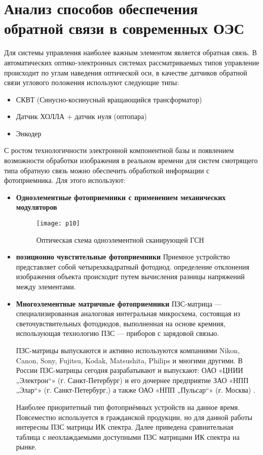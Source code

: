 \section{Анализ способов обеспечения обратной связи в современных ОЭС} \label{sec:ch1/sec3-}

Для системы управления наиболее важным элементом является обратная связь. В автоматических оптико-электронных системах рассматриваемых типов управление происходит по углам наведения оптической оси, в качестве датчиков обратной связи углового положения используют следующие типы:
\begin{itemize}
	\item СКВТ (Синусно-косинусный вращающийся трансформатор)
	\item Датчик ХОЛЛА + датчик нуля (оптопара)
	\item Энкодер
\end{itemize}
С ростом технологичности электронной компонентной базы и появлением возможности обработки изображения в реальном времени для систем смотрящего типа обратную связь можно обеспечить обработкой информации с фотоприемника. Для этого используют:

\begin{itemize}
	\item \textbf{Одноэлементные фотоприемники с применением механических модуляторов}
	\begin{figure}[ht]
		\centering
		\texttt{[image: p10]} 
		\caption{Оптическая схема одноэлементной сканирующей ГСН  }
		\label{fig:p10}
	\end{figure}
	\item \textbf{позиционно чувстительные фотоприемники}
	Приемное устройство представляет собой четырехквадратный фотодиод. определение отклонения изображения объекта происходит путем вычисления разницы напряжений между элементами. 
	
	
	\item \textbf{Многоэлементные матричные фотоприемники}
	ПЗС-матрица — специализированная аналоговая интегральная микросхема, состоящая из светочувствительных фотодиодов, выполненная на основе кремния, использующая технологию ПЗС — приборов с зарядовой связью.
	
	ПЗС-матрицы выпускаются и активно используются компаниями Nikon, Canon, Sony, Fujitsu, Kodak, Matsushita, Philips и многими другими. В России ПЗС-матрицы сегодня разрабатывают и выпускают: ОАО «ЦНИИ „Электрон“» (г. Санкт-Петербург) и его дочернее предприятие ЗАО «НПП „Элар“» (г. Санкт-Петербург,) а также ОАО «НПП „Пульсар“» (г. Москва) \cite[]{CCD}.
	
	Наиболее приоритетный тип фотоприёмных устройств на данное время. Повсеместно используется в гражданской продукции, но для данной работы интересны ПЗС матрицы ИК спектра. Далее приведена сравнительная таблица с неохлаждаемыми доступными ПЗС матрицами ИК спектра на рынке.
	
\end{itemize}


